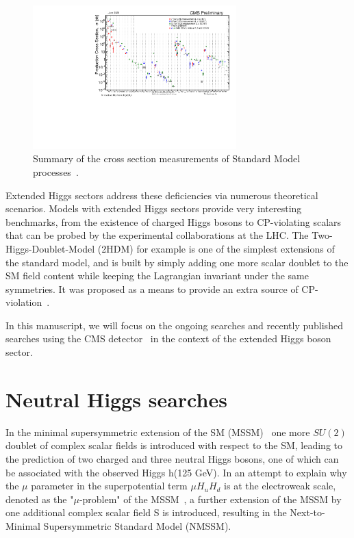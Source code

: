 \documentclass{blois}
\begin{document}
\begin{figure}[!htbp]
    \begin{center}
        \includegraphics[width=0.7\textwidth]{SigmaNew_v0.pdf}
        \caption{
            Summary of the cross section measurements of Standard Model processes~\protect\cite{CMS:xsc_mes}.
        }
        \label{fig:mes}
    \end{center}
\end{figure}

Extended Higgs sectors address these deficiencies via numerous theoretical scenarios. 
Models with extended Higgs sectors provide very interesting benchmarks, from the existence of charged Higgs bosons to CP-violating scalars that can be probed by the experimental collaborations at the LHC.
The Two-Higgs-Doublet-Model (2HDM) for example is one of the simplest extensions of the standard model, and is built by simply adding one more scalar doublet to the SM field content while keeping the Lagrangian invariant under the same symmetries. It was proposed as a means to provide an extra source of CP-violation~\cite{Lee:1973iz}. 

In this manuscript, we will focus on the ongoing searches and recently published searches using the CMS detector~\cite{CMS:2008xjf} in the context of the extended Higgs boson sector.
\section{Neutral Higgs searches}
In the minimal supersymmetric extension of the SM (MSSM)~\cite{ELLWANGER20101} one more $SU(2)$ doublet of complex scalar fields is introduced with respect to the SM, leading to the prediction of two charged and three neutral Higgs bosons, one of which can be associated with the observed Higgs h(125 GeV). In an attempt to explain why the $\mu$ parameter in the superpotential term  $\mu H_{u} H_{d}$ is at the electroweak scale, denoted as the "$\mu$-problem" of the MSSM~\cite{KIM1984150}, a further extension of the MSSM by one additional complex scalar field S is introduced, resulting in the Next-to-Minimal Supersymmetric Standard Model (NMSSM).
\end{document}
